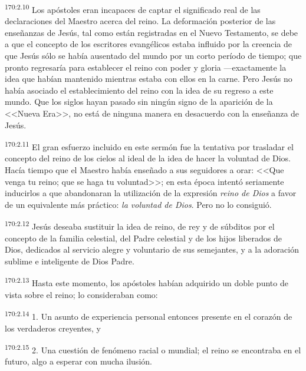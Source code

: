 \par 
\textsuperscript{170:2.10} Los apóstoles eran incapaces de captar el significado real de las declaraciones del Maestro acerca del reino. La deformación posterior de las enseñanzas de Jesús, tal como están registradas en el Nuevo Testamento, se debe a que el concepto de los escritores evangélicos estaba influido por la creencia de que Jesús sólo se había ausentado del mundo por un corto período de tiempo; que pronto regresaría para establecer el reino con poder y gloria ---exactamente la idea que habían mantenido mientras estaba con ellos en la carne. Pero Jesús no había asociado el establecimiento del reino con la idea de su regreso a este mundo. Que los siglos hayan pasado sin ningún signo de la aparición de la <<Nueva Era>>, no está de ninguna manera en desacuerdo con la enseñanza de Jesús.

\par 
\textsuperscript{170:2.11} El gran esfuerzo incluido en este sermón fue la tentativa por trasladar el concepto del reino de los cielos al ideal de la idea de hacer la voluntad de Dios. Hacía tiempo que el Maestro había enseñado a sus seguidores a orar: <<Que venga tu reino; que se haga tu voluntad>>; en esta época intentó seriamente inducirlos a que abandonaran la utilización de la expresión \textit{reino de Dios} a favor de un equivalente más práctico: \textit{la voluntad de Dios}. Pero no lo consiguió.

\par 
\textsuperscript{170:2.12} Jesús deseaba sustituir la idea de reino, de rey y de súbditos por el concepto de la familia celestial, del Padre celestial y de los hijos liberados de Dios, dedicados al servicio alegre y voluntario de sus semejantes, y a la adoración sublime e inteligente de Dios Padre.

\par 
\textsuperscript{170:2.13} Hasta este momento, los apóstoles habían adquirido un doble punto de vista sobre el reino; lo consideraban como:

\par 
\textsuperscript{170:2.14} 1. Un asunto de experiencia personal entonces presente en el corazón de los verdaderos creyentes, y

\par 
\textsuperscript{170:2.15} 2. Una cuestión de fenómeno racial o mundial; el reino se encontraba en el futuro, algo a esperar con mucha ilusión.

